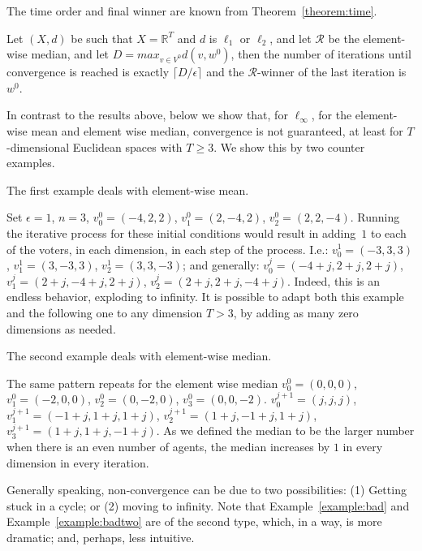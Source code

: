 \documentclass[runningheads,envcountsame]{llncs}
\begin{document}
The time order and final winner are known from Theorem~\ref{theorem:time}.

\begin{corollary}
  Let $(X, d)$ be such that $X = \mathbb{R}^T$ and $d$ is $\ell_1$ or $\ell_2$, and let $\mathcal{R}$ be the element-wise median, and let $D=max_{v \in V^0} d(v, w^0)$, then the number of iterations until convergence is reached is exactly $\lceil D/\epsilon \rceil$ and the $\mathcal{R}$-winner of the last iteration is $w^0$.
\end{corollary}

In contrast to the results above, below we show that, for $\ell_{\infty}$, for the element-wise mean and element wise median, convergence is not guaranteed, at least for $T$-dimensional Euclidean spaces with $T \geq 3$. We show this by two counter examples.

The first example deals with element-wise mean.

\begin{example}\label{example:bad}
%
Set $\epsilon=1$, $n=3$, 
$v^0_0=(-4,2,2)$,
$v^0_1=(2,-4,2)$,
$v^0_2=(2,2,-4)$.
Running the iterative process for these initial conditions would result in adding~$1$ to each of the voters, in each dimension, in each step of the process.
%
I.e.:
  $v_0^1=(-3,3,3)$,
  $v_1^1=(3,-3,3)$,
  $v_2^1=(3,3,-3)$;
and generally:
  $v_0^j=(-4+j,2+j,2+j)$, $v_1^j=(2+j,-4+j,2+j)$, $v_2^j=(2+j,2+j,-4+j)$.
Indeed, this is an endless behavior, exploding to infinity.
It is possible to adapt both this example and the following one to any dimension $T > 3$, by adding as many zero dimensions as needed.
%
\end{example}

The second example deals with element-wise median.

\begin{example}\label{example:badtwo}
  The same pattern repeats for the element wise median
  $v_0^0=(0,0,0)$, $v_1^0=(-2,0,0)$, $v_2^0=(0,-2,0)$, $v_3^0=(0,0,-2)$.
  $v_0^{j+1}=(j,j,j)$, $v_1^{j+1}=(-1+j,1+j,1+j)$, $v_2^{j+1}=(1+j,-1+j,1+j)$, $v_3^{j+1}=(1+j,1+j,-1+j)$. As we defined the median to be the larger number when there is an even number of agents, the median increases by $1$ in every dimension in every iteration.
\end{example}


\begin{remark}
%
Generally speaking, non-convergence can be due to two possibilities:
  (1) Getting stuck in a cycle;
  or
  (2) moving to infinity.
%
Note that Example~\ref{example:bad} and Example~\ref{example:badtwo} are of the second type, which, in a way, is more dramatic; and, perhaps, less intuitive.
%
\end{remark}
\end{document}
